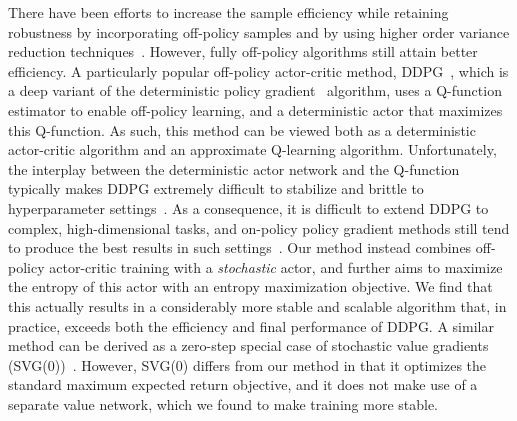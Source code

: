 \documentclass{article}
\begin{document}
There have been efforts to increase the sample efficiency while retaining robustness by incorporating off-policy samples and by using higher order variance reduction techniques~\citep{o2016pgq,gu2016q}. However, fully off-policy algorithms still attain better efficiency. A particularly popular off-policy actor-critic method, DDPG~\cite{lillicrap2015continuous}, which is a deep variant of the deterministic policy gradient~\citep{silver2014deterministic} algorithm, uses a Q-function estimator to enable off-policy learning, and a deterministic actor that maximizes this Q-function. As such, this method can be viewed both as a deterministic actor-critic algorithm and an approximate Q-learning algorithm. Unfortunately, the interplay between the deterministic actor network and the Q-function typically makes DDPG extremely difficult to stabilize and brittle to hyperparameter settings~\citep{duan2016benchmarking,henderson2017deep}. As a consequence, it is difficult to extend DDPG to complex, high-dimensional tasks, and on-policy policy gradient methods still tend to produce the best results in such settings~\citep{gu2016q}. Our method instead combines off-policy actor-critic training with a \emph{stochastic} actor, and further aims to maximize the entropy of this actor with an entropy maximization objective. We find that this actually results in a considerably more stable and scalable algorithm that, in practice, exceeds both the efficiency and final performance of DDPG. A similar method can be derived as a zero-step special case of stochastic value gradients (SVG(0))~\cite{heess2015learning}. However, SVG(0) differs from our method in that it optimizes the standard maximum expected return objective, and it does not make use of a separate value network, which we found to make training more stable.
\end{document}

